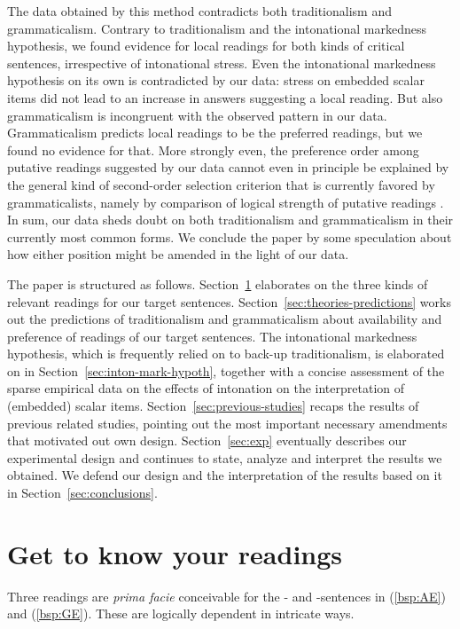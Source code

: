 \documentclass[fleqn,reqno,10pt,draft]{article}
\newcommand{\as}{\acro{as}}
\renewcommand{\es}{\acro{es}}
\begin{document}
The data obtained by this method contradicts both traditionalism and
grammaticalism. Contrary to traditionalism and the intonational
markedness hypothesis, we found evidence for local readings for both
kinds of critical sentences, irrespective of intonational stress. Even
the intonational markedness hypothesis on its own is contradicted by
our data: stress on embedded scalar items did not lead to an increase
in answers suggesting a local reading. But also grammaticalism is
incongruent with the observed pattern in our data.  Grammaticalism
predicts local readings to be the preferred readings, but we found no
evidence for that. More strongly even, the preference order among
putative readings suggested by our data cannot even in principle be
explained by the general kind of second-order selection criterion that
is currently favored by grammaticalists, namely by comparison of
logical strength of putative readings
\citep[e.g.][]{ChierchiaFox2008:The-Grammatical}. In sum, our data
sheds doubt on both traditionalism and grammaticalism in their
currently most common forms. We conclude the paper by some speculation
about how either position might be amended in the light of our data.


The paper is structured as follows. Section~\ref{sec:get-know-your}
elaborates on the three kinds of relevant readings for our target
sentences. Section~\ref{sec:theories-predictions} works out the
predictions of traditionalism and grammaticalism about availability
and preference of readings of our target sentences. The intonational
markedness hypothesis, which is frequently relied on to back-up
traditionalism, is elaborated on in
Section~\ref{sec:inton-mark-hypoth}, together with a concise
assessment of the sparse empirical data on the effects of intonation
on the interpretation of (embedded) scalar
items. Section~\ref{sec:previous-studies} recaps the results of
previous related studies, pointing out the most important necessary
amendments that motivated out own design. Section~\ref{sec:exp}
eventually 
describes our experimental design and continues to state, analyze and interpret the
results we obtained. We defend our design and the interpretation of
the results based on it in Section~\ref{sec:conclusions}.

\section{Get to know your readings}
\label{sec:get-know-your}

Three readings are \emph{prima facie} conceivable for the \as- and
\es-sentences in (\ref{bsp:AE}) and (\ref{bsp:GE}). These are
logically dependent in intricate ways.
\end{document}
